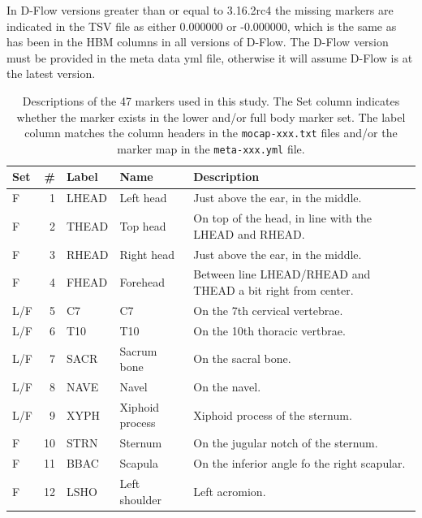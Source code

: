 \documentclass[fleqn,10pt]{wlpeerj}
\begin{document}
In D-Flow versions greater than or equal to 3.16.2rc4 the missing markers are
indicated in the TSV file as either 0.000000 or -0.000000, which is the same as
has been in the HBM columns in all versions of D-Flow. The D-Flow version must
be provided in the meta data yml file, otherwise it will assume D-Flow is at
the latest version.

\begin{table}
  \cprotect\caption{Descriptions of the 47 markers used in this study. The Set
    column indicates whether the marker exists in the lower and/or full body
    marker set.  The label column matches the column headers in the
    \verb|mocap-xxx.txt| files and/or the marker map in the \verb|meta-xxx.yml|
    file.}
  \centering
  \footnotesize
  \begin{tabular}{lrlll}
    \toprule
    Set & \# & Label & Name & Description \\
    \midrule
    F   & 1  & LHEAD & Left head                             & Just above the ear, in the middle. \\
    F   & 2  & THEAD & Top head                              & On top of the head, in line with the LHEAD and RHEAD. \\
    F   & 3  & RHEAD & Right head                            & Just above the ear, in the middle. \\
    F   & 4  & FHEAD & Forehead                              & Between line LHEAD/RHEAD and THEAD a bit right from center. \\
    L/F & 5  & C7    & C7                                    & On the 7th cervical vertebrae. \\
    L/F & 6  & T10   & T10                                   & On the 10th thoracic vertbrae. \\
    L/F & 7  & SACR  & Sacrum bone                           & On the sacral bone. \\
    L/F & 8  & NAVE  & Navel                                 & On the navel. \\
    L/F & 9  & XYPH  & Xiphoid process                       & Xiphoid process of the sternum. \\
    F   & 10 & STRN  & Sternum                               & On the jugular notch of the sternum. \\
    F   & 11 & BBAC  & Scapula                               & On the inferior angle fo the right scapular. \\
    F   & 12 & LSHO  & Left shoulder                         & Left acromion. \\

\end{tabular}
\end{table}
\end{document}
